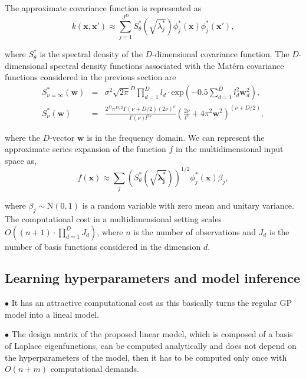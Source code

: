 \documentclass[]{interact}
\theoremstyle{plain}%
\theoremstyle{definition}
\theoremstyle{remark}
\begin{document}
The approximate covariance function is represented as
%
\begin{equation}\label{approxcov_multi}
k(\mathbf{x},\mathbf{x}') \approx \sum_{j=1}^{J^D} S^{\ast}_{\theta}\left(\sqrt{\lambda^{\ast}_j}\right) \phi^{\ast}_j(\mathbf{x}) \phi^{\ast}_j(\mathbf{x}'),
\end{equation}

\noindent where $S^{\ast}_{\theta}$ is the spectral density of the $D$-dimensional covariance function. The $D$-dimensional spectral density functions associated with the Mat\'ern covariance functions considered in the previous section are
%
\begin{eqnarray}
S^{\ast}_{\nu=\infty}(\mathbf{w})&=& \sigma^2 \sqrt{2\pi}^D \prod_{d=1}^D l_d \cdot \text{exp}\left(-0.5 \sum_{d=1}^D l_d^2 \mathbf{w}_d^2\right), \nonumber \\
%
S^{\ast}_{\nu}(\mathbf{w})&=& \frac{2^D\pi^{D/2}\Gamma(\nu+D/2)(2\nu)^{\nu}}{\Gamma(\nu)l^{2\nu}}\left(\frac{2\nu}{l^2}+4\pi^2\mathbf{w}^2 \right)^{(\nu+D/2)}, \nonumber
\end{eqnarray}

\noindent where the $D$-vector $\mathbf{w}$ is in the frequency domain. We can represent the approximate series expansion of the function $f$ in the multidimensional input space as,
%
\begin{equation}\label{approxf}
f(\mathbf{x}) \approx \sum_{j} \left( S^{\ast}_{\theta}(\sqrt{\boldsymbol{\lambda^{\ast}_j}})\right)^{1/2} \phi^{\ast}_j(\mathbf{x}) \beta_j, 
\end{equation}

\noindent where $\beta_j \sim \text{N}(0,1)$ is a random variable with zero mean and unitary variance. The computational cost in a multidimensional setting scales $O((n+1)\cdot \prod_{d=1}^D J_d )$, where $n$ is the number of observations and $J_d$ is the number of basis functions considered in the dimension $d$.

\subsection{Learning hyperparameters and model inference}

\vspace{2mm}
$\bullet$ It has an attractive computational cost as this basically turns the regular GP model into a lineal model.

\vspace{2mm}
$\bullet$ The design matrix of the proposed linear model, which is composed of a basis of Laplace eigenfunctions, can be computed analytically and does not depend on the hyperparameters of the model, then it has to be computed only once with $O(n+m)$ computational demands.
\end{document}
